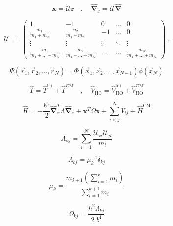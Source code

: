 \begin{equation}
	\boldsymbol{x} = \mathcal{U} \boldsymbol{r} \quad , \quad \hat{\boldsymbol{\nabla}}_x = \mathcal{U} \hat{\boldsymbol{\nabla}}
\end{equation}
	
\begin{equation}
 \mathcal{U} \: = \: \begin{pmatrix}
1 & -1 & 0 & \hdots & 0 \\
\frac{m_1}{m_1 + m_2} & \frac{m_2}{m_1 + m_2} & -1 & \hdots & 0 \\
\vdots & \vdots & \vdots & \ddots & \vdots \\
\frac{m_1}{m_1 + \ldots + m_N} & \frac{m_2}{m_1  + \ldots + m_N} & \hdots & \hdots & \frac{m_N}{m_1  + \ldots + m_N}
\end{pmatrix} \; .
\end{equation}

\begin{equation}
	\Psi \left( \vec{r}_1 , \vec{r}_2 , \ldots , \vec{r}_N \right) = \Phi \left( \vec{x}_1 , \vec{x}_2 , \ldots , \vec{x}_{N-1} \right) \phi( \vec{x}_N )
\end{equation}

\begin{equation}
	\hat{T} = \hat{T}^{\mathrm{int}} + \hat{T}^{\mathrm{CM}} \quad , \quad \hat{V}_{\mathrm{HO}} = \hat{V}_{\mathrm{HO}}^{\mathrm{int}} + \hat{V}_{\mathrm{HO}}^{\mathrm{CM}} 
\end{equation}

\begin{equation}
	\hat{H} = - \frac{\hbar^2}{2} \hat{\boldsymbol{\nabla}}_{x}^{T} \Lambda \hat{\boldsymbol{\nabla}}_x + \boldsymbol{x}^T \Omega \boldsymbol{x} + \sum_{i < j}^{N} V_{ij} + \hat{H}^{\mathrm{CM}} 
\end{equation}

\begin{equation}
	\Lambda_{kj} = \sum_{i = 1}^{N} \frac{\mathcal{U}_{ki} \mathcal{U}_{ji}}{m_i}
\end{equation}

\begin{equation}
	\Lambda_{kj} = \mu_{k}^{-1} \delta_{kj}
\end{equation}

\begin{equation}
	\mu_k = \frac{m_{k+1} \left( \sum_{i= 1}^{k} m_{i} \right)}{\sum_{i= 1}^{k+1} m_{i}}
\end{equation}

\begin{equation}
	\Omega_{kj} = \frac{\hbar^2 \Lambda_{kj} }{2 \;  b^4 }
\end{equation}